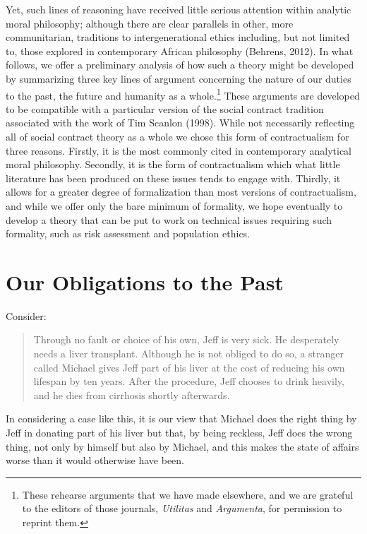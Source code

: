 \documentclass[man,11pt,a4paper]{apa7}
\begin{document}
Yet, such lines of reasoning have received little serious attention within analytic moral philosophy; although there are clear parallels in other, more communitarian, traditions to intergenerational ethics including, but not limited to, those explored in contemporary African philosophy (Behrens, 2012). In what follows, we offer a preliminary analysis of how such a theory might be developed by summarizing three key lines of argument concerning the nature of our duties to the past, the future and humanity as a whole.\footnote{These rehearse arguments that we have made elsewhere, and we are grateful to the editors of those journals, \textit{Utilitas} and \textit{Argumenta}, for permission to reprint them.} These arguments are developed to be compatible with a particular version of the social contract tradition associated with the work of Tim Scanlon (1998). While not necessarily reflecting all of social contract theory as a whole we chose this form of contractualism for three reasons. Firstly, it is the most commonly cited in contemporary analytical moral philosophy. Secondly, it is the form of contractualism which what little literature has been produced on these issues tends to engage with. Thirdly, it allows for a greater degree of formalization than most versions of contractualism, and while we offer only the bare minimum of formality, we hope eventually to develop a theory that can be put to work on technical issues requiring such formality, such as risk assessment and population ethics.

\section{Our Obligations to the Past}

Consider:

\begin{quote}
Through no fault or choice of his own, Jeff is very sick. He desperately needs a liver transplant. Although he is not obliged to do so, a stranger called Michael gives Jeff part of his liver at the cost of reducing his own lifespan by ten years. After the procedure, Jeff chooses to drink heavily, and he dies from cirrhosis shortly afterwards.
\end{quote}

In considering a case like this, it is our view that Michael does the right thing by Jeff in donating part of his liver but that, by being reckless, Jeff does the wrong thing, not only by himself but also by Michael, and this makes the state of affairs worse than it would otherwise have been.
\end{document}
